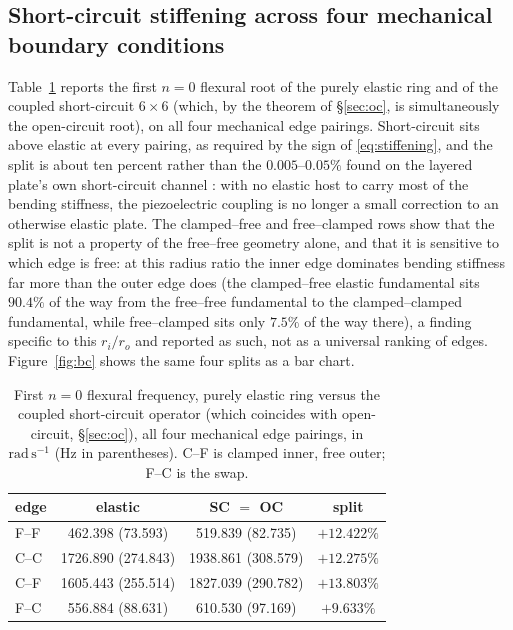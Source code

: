 \documentclass[11pt]{article}
\begin{document}
\subsection{Short-circuit stiffening across four mechanical boundary
conditions}\label{sec:stiffening-results}
Table~\ref{tab:stiffening} reports the first $n=0$ flexural root of the
purely elastic ring and of the coupled short-circuit $6\times6$ (which,
by the theorem of \S\ref{sec:oc}, is simultaneously the open-circuit
root), on all four mechanical edge pairings. Short-circuit sits above
elastic at every pairing, as required by the sign of
\eqref{eq:stiffening}, and the split is about ten percent rather than the
$0.005$--$0.05\%$ found on the layered plate's own
short-circuit channel \cite{mccune2026piezo}: with no elastic host to
carry most of the bending stiffness, the piezoelectric coupling is no
longer a small correction to an otherwise elastic plate. The
clamped--free and free--clamped rows show that the split is not a
property of the free--free geometry alone, and that it is sensitive to
which edge is free: at this radius ratio the inner edge dominates
bending stiffness far more than the outer edge does (the clamped--free
elastic fundamental sits $90.4\%$ of the way from the free--free
fundamental to the clamped--clamped fundamental, while free--clamped
sits only $7.5\%$ of the way there), a finding specific to this
$r_i/r_o$ and reported as such, not as a universal ranking of edges.
Figure~\ref{fig:bc} shows the same four splits as a bar chart.

\begin{table}[H]
\centering
\caption{First $n=0$ flexural frequency, purely elastic ring versus the
coupled short-circuit operator (which coincides with open-circuit,
\S\ref{sec:oc}), all four mechanical edge pairings, in
$\mathrm{rad\,s^{-1}}$ (Hz in parentheses). C--F is clamped inner, free
outer; F--C is the swap.}
\label{tab:stiffening}
\small
\begin{tabular}{@{}lccc@{}}
\toprule
edge & elastic & SC $=$ OC & split \\
\midrule
F--F & 462.398 (73.593) & 519.839 (82.735) & $+12.422\%$ \\
C--C & 1726.890 (274.843) & 1938.861 (308.579) & $+12.275\%$ \\
C--F & 1605.443 (255.514) & 1827.039 (290.782) & $+13.803\%$ \\
F--C & 556.884 (88.631) & 610.530 (97.169) & $+9.633\%$ \\
\bottomrule
\end{tabular}
\end{table}
\end{document}

